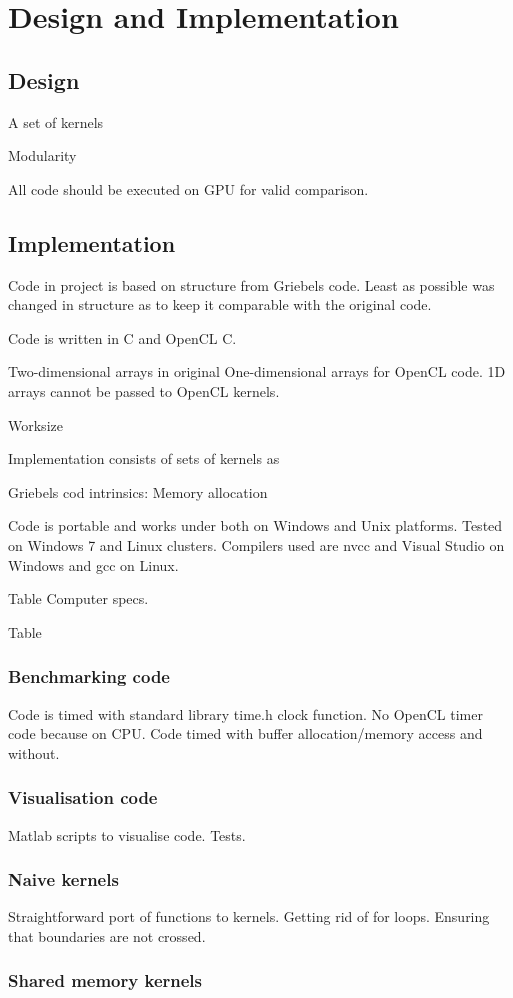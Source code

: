 \chapter{Design and Implementation}

\section{Design}

A set of kernels

Modularity

All code should be executed on GPU for valid comparison. 

\section{Implementation}
Code in project is based on structure from Griebels code\cite{griebel1998numerical}. Least as possible was changed in structure as to keep it comparable with the original code.

Code is written in C and OpenCL C.

Two-dimensional arrays in original 
One-dimensional arrays for OpenCL code. 1D arrays cannot be passed to OpenCL kernels.

Worksize

Implementation consists of sets of kernels as 

Griebels cod intrinsics: Memory allocation

Code is portable and works under both on Windows and Unix platforms. Tested on Windows 7 and Linux clusters. Compilers used are nvcc and Visual Studio on Windows and gcc on Linux.

Table Computer specs.


Table

\subsection{Benchmarking code}
Code is timed with standard library time.h clock function.
No OpenCL timer code because on CPU. Code timed with buffer allocation/memory access and without.

\subsection{Visualisation code}
Matlab scripts to visualise code. Tests.

\subsection{Naive kernels}
Straightforward port of functions to kernels. Getting rid of for loops. Ensuring that boundaries are not crossed.


\subsection{Shared memory kernels}